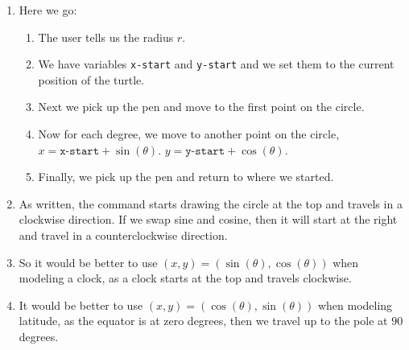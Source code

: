 \documentclass[noauthor,nooutcomes,hints,handout]{ximera}
\begin{document}
\begin{question}
\begin{enumerate}
  \end{enumerate}
  \begin{freeResponse}
    \begin{enumerate}
    \item Here we go:
      \begin{enumerate}
      \item The user tells us the radius $r$.
      \item We have variables \texttt{x-start} and \texttt{y-start}
        and we set them to the current position of the turtle.
      \item Next we pick up the pen and move to the first point on the circle.
      \item Now for each degree, we move to another point on the circle, $x= \texttt{x-start} + \sin(\theta)$. $y= \texttt{y-start} + \cos(\theta)$. 
      \item Finally, we pick up the pen and return to where we started.
      \end{enumerate}
    \item As written, the command starts drawing the circle at the top
      and travels in a clockwise direction. If we swap sine and
      cosine, then it will start at the right and travel in a
      counterclockwise direction.
    \item So it would be better to use $(x,y) =
      (\sin(\theta),\cos(\theta))$ when modeling a clock, as a clock starts at the top and travels clockwise.
    \item It would be better to use $(x,y) =
      (\cos(\theta),\sin(\theta))$ when modeling latitude, as the
      equator is at zero degrees, then we travel up to the pole at
      $90$ degrees.
    \end{enumerate}
  \end{freeResponse}
\end{question}
\end{document}
